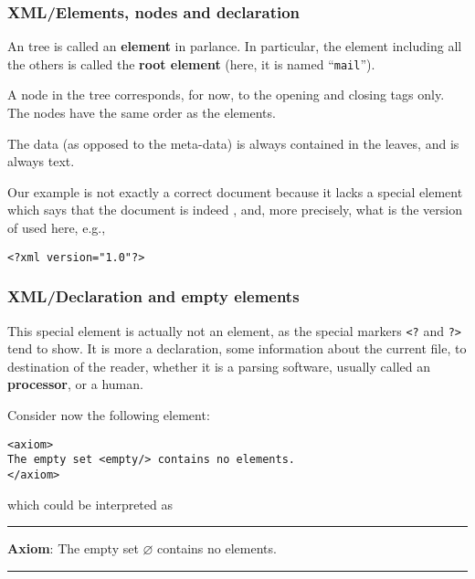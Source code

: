 %
\begin{frame}[containsverbatim]
\frametitle{XML/Elements, nodes and declaration}

An \XML tree is called an \textbf{element} in \XML parlance. In
particular, the element including all the others is called the
\textbf{root element} (here, it is named ``\texttt{mail}'').

\bigskip

A node in the \XML tree corresponds, for now, to the opening and
closing tags only. The nodes have the same order as the elements.

\bigskip

The data (as opposed to the meta-data) is always contained in the
leaves, and is always text.

\bigskip

Our example is not exactly a correct \XML document because it lacks a
special element which says that the document is indeed \XML, and, more
precisely, what is the version of \XML used here, e.g.,
\begin{verbatim}
<?xml version="1.0"?>
\end{verbatim}

\end{frame}

%
\begin{frame}[containsverbatim]
\frametitle{XML/Declaration and empty elements}

This special element is actually not an element, as the special
markers \texttt{<?} and \texttt{?>} tend to show. It is more a
declaration, some information about the current file, to destination
of the reader, whether it is a parsing software, usually called an
\textbf{\XML processor}, or a human.

\bigskip

Consider now the following element:
\begin{verbatim}
<axiom>
The empty set <empty/> contains no elements.
</axiom>
\end{verbatim}
which could be interpreted as\\

\noindent\rule{\linewidth}{0.5pt}
\textsf{
\textbf{Axiom}: The empty set \(\varnothing\) contains no elements. 
}\\

\noindent\rule{\linewidth}{0.5pt}

\end{frame}

